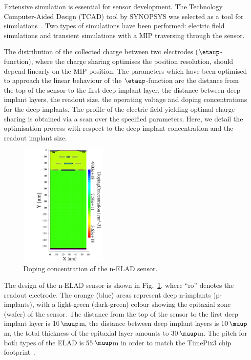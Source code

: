 \documentclass[a4paper,11pt]{article}
\begin{document}
Extensive simulation is essential for sensor development. 
The Technology Computer-Aided Design (TCAD) tool by SYNOPSYS was selected as a tool for simulations~\cite{syn}.
Two types of simulations have been performed: electric field simulations and transient simulations with a MIP traversing through the sensor.

The distribution of the collected charge between two electrodes ($\etaup$-function), where the charge sharing optimises the position resolution, should depend linearly on the MIP position. 
The parameters which have been optimised to approach the linear behaviour of the $\etaup$-function are the distance from the top of the sensor to the first deep implant layer, the distance between deep implant layers,
 the readout size, the operating voltage and doping concentrations for the deep implants. 
The profile of the electric field yielding optimal charge sharing is obtained via a scan over the specified parameters.
Here, we detail the optimisation process with respect to the deep implant concentration and the readout implant size.

\begin{figure}[t]
  \centering
  \includegraphics[height=6.1cm]{figures/nelad2.pdf}
  \caption{Doping concentration of the n-ELAD sensor.}
  \label{fig:geom}
\end{figure}

The design of the n-ELAD sensor is shown in Fig.~\ref{fig:geom}, where ``ro'' denotes the readout electrode.
The orange (blue) areas represent deep n-implants (p-implants), with a light-green (dark-green) colour showing the epitaxial zone (wafer) of the sensor. 
The distance from the top of the sensor to the first deep implant layer is 10\,$\muup$m, the distance between deep implant layers is 10\,$\muup$m, the total thickness of the epitaxial layer amounts to 30\,$\muup$m.
The pitch for both types of the ELAD is 55\,$\muup$m in order to match the TimePix3 chip footprint~\cite{tp3}.
\end{document}
